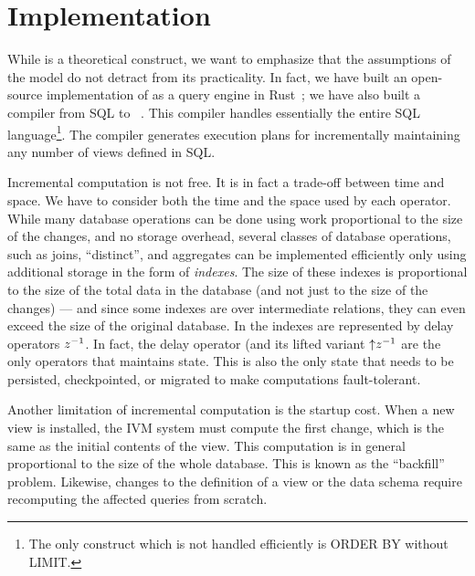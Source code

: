 \section{Implementation}\label{sec:implementation}


While \dbsp is a theoretical construct, we want to emphasize that the
assumptions of the model do not detract from its practicality.  In
fact, we have built an open-source implementation of \dbsp as a query
engine in Rust~\cite{dbsp-crate}; we have also built a compiler from
SQL to \dbsp~\cite{sql-to-dbsp-compiler}.  This compiler handles
essentially the entire SQL language\footnote{The only construct which
is not handled efficiently is ORDER BY without LIMIT.}.  The compiler
generates execution plans for incrementally maintaining any number of
views defined in SQL.

Incremental computation is not free.  It is in fact a trade-off
between time and space.  We have to consider both the time and the
space used by each operator.  While many database operations can be
done using work proportional to the size of the changes, and no
storage overhead, several classes of database operations, such as
joins, ``distinct'', and aggregates can be implemented efficiently
only using additional storage in the form of \emph{indexes}.  The size
of these indexes is proportional to the size of the total data in the
database (and not just to the size of the changes) --- and since some
indexes are over intermediate relations, they can even exceed the size
of the original database.  In \dbsp the indexes are represented by
delay operators $z^{-1}$.  In fact, the delay operator (and its lifted
variant ${\uparrow}z^{-1}$ are the only operators that maintains state.
This is also the only state that needs to be persisted, checkpointed,
or migrated to make \dbsp computations fault-tolerant.

Another limitation of incremental computation is the startup cost.
When a new view is installed, the IVM system must compute the first
change, which is the same as the initial contents of the view.  This
computation is in general proportional to the size of the whole
database.  This is known as the ``backfill'' problem.  Likewise,
changes to the definition of a view or the data schema require
recomputing the affected queries from scratch.

